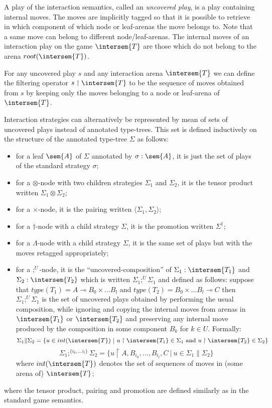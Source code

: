 A play of the interaction semantics, called an \emph{uncovered
play}, is a play containing internal moves.
The moves are implicitly tagged so that it is possible to retrieve in which component
of which node or leaf-arenas the move belongs to. Note that a same move can belong to different node/leaf-arenas.
The internal moves of an interaction play on the game $\intersem{T}$ are those which do not
belong to the arena $root(\intersem{T})$.

For any uncovered play $s$ and any interaction arena $\intersem{T}$
we can define the filtering operator $s\upharpoonright \intersem{T}$ to be the
sequence of moves obtained from $s$ by keeping only the moves
belonging to a node or leaf-arena of $\intersem{T}$.


Interaction strategies can alternatively be represented by mean of sets of
uncovered plays instead of annotated type-trees. This set is defined
inductively on the structure of the annotated type-tree $\Sigma$ as follows:
\begin{itemize}
\item for a leaf $\sem{A}$ of $\Sigma$ annotated by $\sigma :\sem{A}$, it is just the set of plays of the standard strategy $\sigma$;
\item for a $\otimes$-node with two children strategies $\Sigma_1$ and $\Sigma_2$, it is the tensor product written $\Sigma_1 \otimes \Sigma_2$;
\item for a $\times$-node, it is the pairing written $\langle \Sigma_1, \Sigma_2 \rangle$;
\item for a $\dagger$-node with a child strategy $\Sigma$, it is the promotion written $\Sigma^\dagger$;
\item for a $\Lambda$-node with a child strategy $\Sigma$, it is the same set of plays but with the moves retagged appropriately;

\item for a $;^U$-node, it is the ``uncovered-composition'' of $\Sigma_1 : \intersem{T_1}$ and $\Sigma_2 :\intersem{T_2}$ which is written $\Sigma_1
;^U \Sigma_1$ and defined as follows: suppose that $type(T_1) =
A \multimap B_0 \times \ldots B_l$ and $type(T_2) = B_0 \times \ldots B_l \multimap C$
then $\Sigma_1
;^U \Sigma_1$ is the set of uncovered plays
obtained by performing the usual composition, while ignoring and
copying the internal moves from arenas in $\intersem{T_1}$ or $\intersem{T_2}$
and preserving any internal move produced by the composition in some component $B_k$ for $k \in U$. Formally:
$$ \Sigma_1 \| \Sigma_2 = \{ u \in int(\intersem{T}) \ | \ u \upharpoonright \intersem{T_1} \in \Sigma_1 \mbox{ and } u \upharpoonright \intersem{T_2} \in \Sigma_2 \}$$
$$ \Sigma_1 ;^{\{i_0, \ldots i_l\}} \Sigma_2 = \{ u \upharpoonright A, B_{i_0}, \ldots, B_{i_l}, C \ | \ u \in \Sigma_1 \| \Sigma_2 \}$$
where $int(\intersem{T})$ denotes the set of sequences of moves in (some arena of) $\intersem{T}$;
\end{itemize}
where the tensor product, pairing and promotion are defined similarly as in the standard game semantics.


